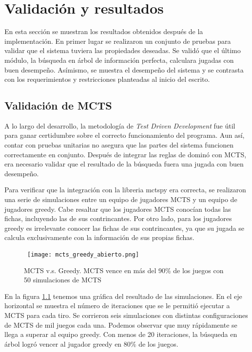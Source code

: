 \chapter{Validación y resultados}

\noindent
En esta sección se muestran los resultados obtenidos después de la
implementación. En primer lugar se realizaron un conjunto de pruebas para
validar que el sistema tuviera las propiedades deseadas. Se validó que el último
módulo, la búsqueda en árbol de información perfecta, calculara jugadas con buen
desempeño. Asímismo, se muestra el desempeño del sistema y se contrasta con los
requerimientos y restricciones planteadas al inicio del escrito.

\section{Validación de MCTS}

A lo largo del desarrollo, la metodología de  \textit{Test Driven Development}
fue útil para ganar certidumbre sobre el correcto funcionamiento del programa.
Aun así, contar con pruebas unitarias no asegura que las partes del sistema
funcionen correctamente en conjunto. Después de integrar las reglas de dominó
con MCTS, era necesario validar que el resultado de la búsqueda fuera una jugada
con buen desempeño.

Para verificar que la integración con la libreria mctspy era correcta, se
realizaron una serie de simulaciones entre un equipo de jugadores MCTS y un
equipo de jugadores greedy. Cabe resaltar que los jugadores MCTS conocían todas
las fichas, incluyendo las de sus contrincantes. Por otro lado, para los
jugadores greedy es irrelevante conocer las fichas de sus contrincantes, ya que
su jugada se calcula exclusivamente con la información de sus propias fichas.

\begin{figure}[ht]
    \begin{center}
        \hbox{\hspace{-1em} \texttt{[image: mcts\_greedy\_abierto.png]}}
        \caption{MCTS v.s. Greedy. MCTS vence en más del 90\% de los juegos con 50 simulaciones de MCTS}
        \label{MGA}
    \end{center}
\end{figure}

En la figura \ref{MGA} tenemos una gráfica del resultado de las simulaciones. En
el eje horizontal se muestra el número de iteraciones que se le permitió
ejecutar a MCTS para cada tiro. Se corrieron seis simulaciones con distintas
configuraciones de MCTS de mil juegos cada una. Podemos observar que muy
rápidamente se llega a superar al equipo greedy. Con menos de 20 iteraciones, la
búsqueda en árbol logró vencer al jugador greedy en 80\% de los juegos.

